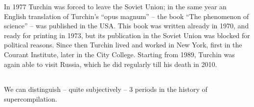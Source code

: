 In 1977 Turchin was forced to leave the Soviet Union;
in the same year an English translation of Turchin's ``opus magnum'' 
-- the book ``The phenomenon of science'' --
was published in the USA. This book was written already in 1970,
and ready for printing in 1973, but its publication in the Soviet Union
was blocked for political reasons.
Since then Turchin lived and worked in New York, first in the Courant Institute,
later in the City College.
Starting from 1989, Turchin was again able to visit Russia, which
he did regularly till his death in 2010.


\begin{center}\begin{tabular*}{.5\textwidth}{c}\hline\end{tabular*}\end{center}

We can distinguish -- quite subjectively -- 3 periods in the history 
of supercompilation.

